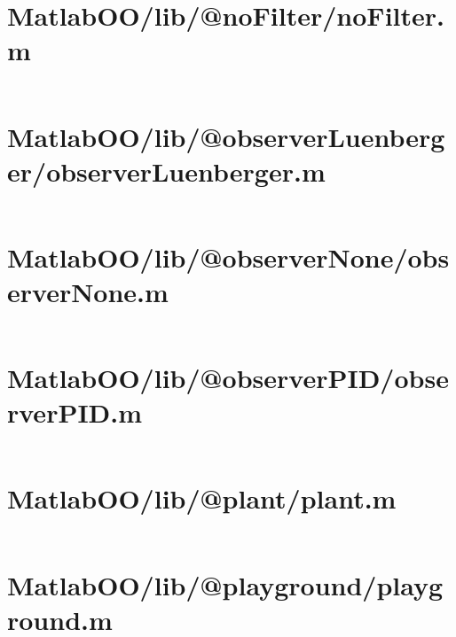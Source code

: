 \pagebreak
\section*{MatlabOO/lib/@noFilter/noFilter.m}\label{code:MatlabOO/lib/@noFilter/noFilter.m}
\inputminted[linenos,fontsize=\scriptsize]{matlab}{/home/dcouture/git/mathyourlife/TSatPy/beta_versions/matlab_object_oriented/lib/@noFilter/noFilter.m}

\pagebreak
\section*{MatlabOO/lib/@observerLuenberger/observerLuenberger.m}\label{code:MatlabOO/lib/@observerLuenberger/observerLuenberger.m}
\inputminted[linenos,fontsize=\scriptsize]{matlab}{/home/dcouture/git/mathyourlife/TSatPy/beta_versions/matlab_object_oriented/lib/@observerLuenberger/observerLuenberger.m}

\pagebreak
\section*{MatlabOO/lib/@observerNone/observerNone.m}\label{code:MatlabOO/lib/@observerNone/observerNone.m}
\inputminted[linenos,fontsize=\scriptsize]{matlab}{/home/dcouture/git/mathyourlife/TSatPy/beta_versions/matlab_object_oriented/lib/@observerNone/observerNone.m}

\pagebreak
\section*{MatlabOO/lib/@observerPID/observerPID.m}\label{code:MatlabOO/lib/@observerPID/observerPID.m}
\inputminted[linenos,fontsize=\scriptsize]{matlab}{/home/dcouture/git/mathyourlife/TSatPy/beta_versions/matlab_object_oriented/lib/@observerPID/observerPID.m}

\pagebreak
\section*{MatlabOO/lib/@plant/plant.m}\label{code:MatlabOO/lib/@plant/plant.m}
\inputminted[linenos,fontsize=\scriptsize]{matlab}{/home/dcouture/git/mathyourlife/TSatPy/beta_versions/matlab_object_oriented/lib/@plant/plant.m}

\pagebreak
\section*{MatlabOO/lib/@playground/playground.m}\label{code:MatlabOO/lib/@playground/playground.m}
\inputminted[linenos,fontsize=\scriptsize]{matlab}{/home/dcouture/git/mathyourlife/TSatPy/beta_versions/matlab_object_oriented/lib/@playground/playground.m}

